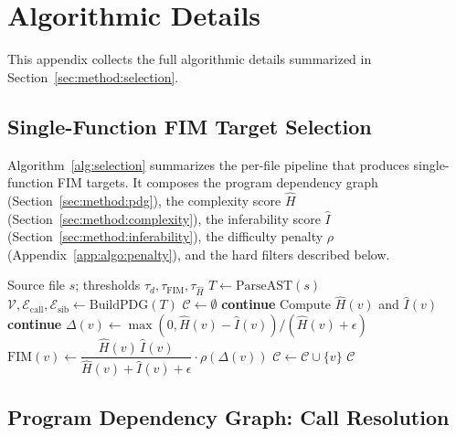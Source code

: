 \section{Algorithmic Details}
\label{app:algo}

This appendix collects the full algorithmic details summarized in
Section~\ref{sec:method:selection}.

\subsection{Single-Function FIM Target Selection}
\label{app:algo:single}

Algorithm~\ref{alg:selection} summarizes the per-file pipeline that
produces single-function FIM targets. It composes the program
dependency graph (Section~\ref{sec:method:pdg}), the complexity score
$\hat{H}$ (Section~\ref{sec:method:complexity}), the inferability score
$\hat{I}$ (Section~\ref{sec:method:inferability}), the difficulty
penalty $\rho$ (Appendix~\ref{app:algo:penalty}), and the hard filters
described below.

\begin{algorithm}[h]
\caption{Single-function FIM target selection for one file.}
\label{alg:selection}
\begin{algorithmic}[1]
  \Require Source file $s$; thresholds $\tau_d, \tau_{\mathrm{FIM}}, \tau_{\hat H}$
  \State $T \gets \mathrm{ParseAST}(s)$
  \State $\mathcal{V}, \mathcal{E}_{\mathrm{call}}, \mathcal{E}_{\mathrm{sib}} \gets \mathrm{BuildPDG}(T)$
  \State $\mathcal{C} \gets \emptyset$
      \State \textbf{continue}
    \EndIf
    \State Compute $\hat{H}(v)$ and $\hat{I}(v)$
     \textbf{continue} \EndIf
    \State $\Delta(v) \gets \max(0, \hat{H}(v)-\hat{I}(v)) / (\hat{H}(v)+\epsilon)$
    \State $\mathrm{FIM}(v) \gets \dfrac{\hat{H}(v)\,\hat{I}(v)}{\hat{H}(v)+\hat{I}(v)+\epsilon}\cdot \rho(\Delta(v))$
      \State $\mathcal{C} \gets \mathcal{C} \cup \{v\}$
    \EndIf
  \EndFor
  \State \Return $\mathcal{C}$ 
\end{algorithmic}
\end{algorithm}

\subsection{Program Dependency Graph: Call Resolution}
\label{app:algo:pdg}

